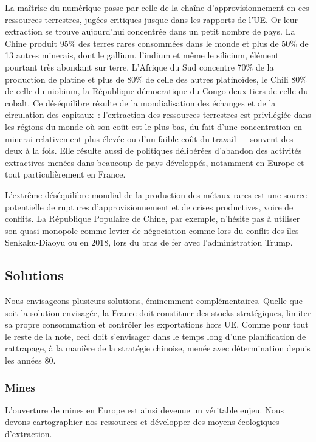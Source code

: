 \documentclass[a4paper]{article}
\begin{document}
La maîtrise du numérique passe par celle de la chaîne d’approvisionnement en ces ressources terrestres, jugées critiques jusque dans les rapports de l’UE. Or leur extraction se trouve aujourd’hui concentrée dans un petit nombre de pays. La Chine produit 95\% des terres rares consommées dans le monde et plus de 50\% de 13 autres minerais, dont le gallium, l’indium et même le silicium, élément pourtant très abondant sur terre. L’Afrique du Sud concentre 70\% de la production de platine et plus de 80\% de celle des autres platinoïdes, le Chili 80\% de celle du niobium, la République démocratique du Congo deux tiers de celle du cobalt\cite{eucriticalrawmaterials}. Ce déséquilibre résulte de la mondialisation des échanges et de la circulation des capitaux~: l’extraction des ressources terrestres est privilégiée dans les régions du monde où son coût est le plus bas, du fait d’une concentration en minerai relativement plus élevée ou d’un faible coût du travail –-- souvent des deux à la fois. Elle résulte aussi de politiques délibérées d’abandon des activités extractives menées dans beaucoup de pays développés, notamment en Europe et tout particulièrement en France. 

L’extrême déséquilibre mondial de la production des métaux rares est une source potentielle de ruptures d’approvisionnement et de crises productives, voire de conflits. La République Populaire de Chine, par exemple, n’hésite pas à utiliser son quasi-monopole comme levier de négociation comme lors du conflit des îles Senkaku-Diaoyu ou en 2018, lors du bras de fer avec l’administration Trump. 

\subsection{Solutions}
Nous envisageons plusieurs solutions, éminemment complémentaires. Quelle que soit la solution envisagée, la France doit constituer des stocks stratégiques, limiter sa propre consommation et contrôler les exportations hors UE. Comme pour tout le reste de la note, ceci doit s’envisager dans le temps long d’une planification de rattrapage, à la manière de la stratégie chinoise, menée avec détermination depuis les années 80\cite{strategiechinoise}. 
\subsubsection{Mines}
L’ouverture de mines en Europe est ainsi devenue un véritable enjeu. Nous devons cartographier nos ressources et développer des moyens écologiques d’extraction.
\end{document}

